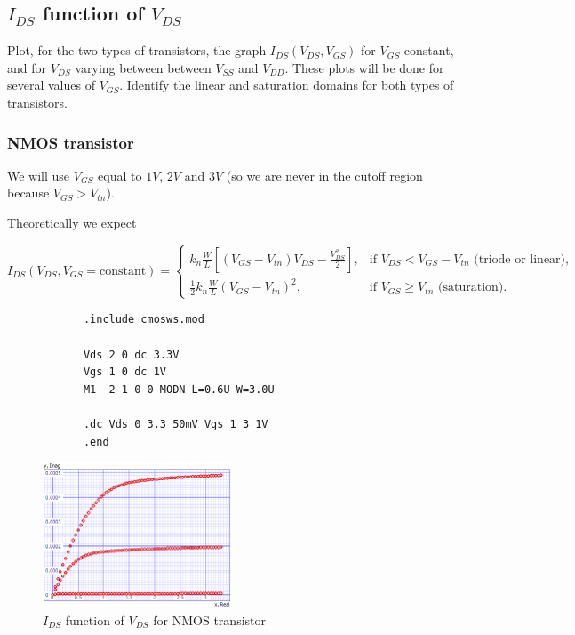 \documentclass[../main.tex]{subfiles}
\begin{document}
	\subsection{$I_{DS}$ function of $V_{DS}$}
	{
		\begin{tcolorbox}[colback=gray!5!white,colframe=gray!75!black]
			Plot, for the two types of transistors, the graph $I_{DS}(V_{DS}, V_{GS})$ for $V_{GS}$ constant, and for $V_{DS}$ varying between between $V_{SS}$ and $V_{DD}$. These plots will be done for several values of $V_{GS}$. Identify the linear and saturation domains for both types of transistors.
		\end{tcolorbox}
		
	
		\subsubsection{NMOS transistor}
		{
			
		We will use $V_{GS}$ equal to $1V$, $2V$ and $3V$ (so we are never in the cutoff region because $V_{GS} > V_{tn}$).
			
		Theoretically we expect
		
		\begin{equation}
			I_{DS}(V_{DS}, V_{GS} = \text{constant}) = 
			\begin{cases} 
				k_n \frac{W}{L} \left[(V_{GS} - V_{tn})V_{DS} - \frac{V_{DS}^2}{2}\right], & \text{if } V_{DS} < V_{GS} - V_{tn} \text{ (triode or linear)}, \\[5pt]
				\frac{1}{2} k_n \frac{W}{L} (V_{GS} - V_{tn})^2, & \text{if } V_{GS} \geq V_{tn} \text{ (saturation)}.
			\end{cases}
		\end{equation}
		
		\begin{lstlisting}
			.include cmosws.mod
			
			Vds 2 0 dc 3.3V
			Vgs 1 0 dc 1V
			M1  2 1 0 0 MODN L=0.6U W=3.0U
			
			.dc Vds 0 3.3 50mV Vgs 1 3 1V
			.end
		\end{lstlisting}
		
		\begin{figure}[H]
			\centering
			\includegraphics[width=0.5\textwidth]{plots/Q2_nmos.png}
			\caption{$I_{DS}$ function of $V_{DS}$ for NMOS transistor}
		\end{figure}
		
}}
\end{document}

